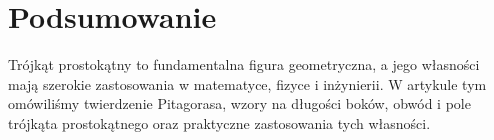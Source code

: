 \documentclass[12pt]{article}
\begin{document}
\section{Podsumowanie}
Trójkąt prostokątny to fundamentalna figura geometryczna, a jego własności mają szerokie zastosowania w matematyce, fizyce i inżynierii. W artykule tym omówiliśmy twierdzenie Pitagorasa, wzory na długości boków, obwód i pole trójkąta prostokątnego oraz praktyczne zastosowania tych własności.
\end{document}
